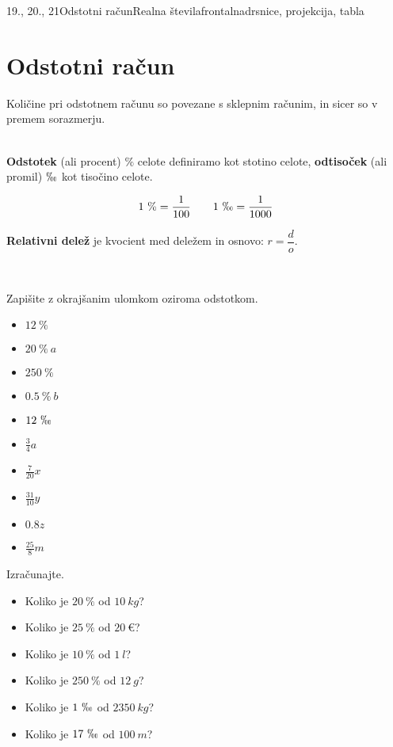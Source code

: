 \begin{priprava}{19., 20., 21}{}{Odstotni račun}{Realna števila}{frontalna}{drsnice, projekcija, tabla}
    
    \section{Odstotni račun}  
        
    Količine pri odstotnem računu so povezane s sklepnim računim, in sicer so v premem sorazmerju.

~\\
    \textbf{Odstotek} (ali procent) $\text{\%}$ celote definiramo kot stotino celote,
    \textbf{odtisoček} (ali promil) $\permil$ kot tisočino celote.

    $$ 1~\text{\%}=\dfrac{1}{100} \quad \quad {1~\permil=\dfrac{1}{1000}}$$



    \textbf{Relativni delež} je kvocient med deležem in osnovo: $r=\dfrac{d}{o}$.



~~~\\

\begin{multicols}{2}
\begin{naloga}
    Zapišite z okrajšanim ulomkom oziroma odstotkom.
    \begin{multicols}{2}
    \begin{itemize}
            \item $12~\%$ 
            \item $20~\%~a$ 
            \item $250~\%$ 
            \item $0.5~\%~b$ 
            \item $12~\permil$ 
            \item $\frac{3}{4}a$ 
            \item $\frac{7}{20}x$ 
            \item $\frac{31}{10}y$ 
            \item $0.8 z$ 
            \item $\frac{25}{8}m$
    \end{itemize} 
\end{multicols}
\end{naloga}




\begin{naloga}
    Izračunajte.
    \begin{itemize}
            \item Koliko je $20~\%$ od $10~kg$? 
            \item Koliko je $25~\%$ od $20~€$? 
            \item Koliko je $10~\%$ od $1~l$? 
            \item Koliko je $250~\%$ od $12~g$? 
            \item Koliko je $1~\permil$ od $2350~kg$? 
            \item Koliko je $17~\permil$ od $100~m$? 
    \end{itemize} ~
\end{naloga}


\end{multicols}
\end{priprava}
